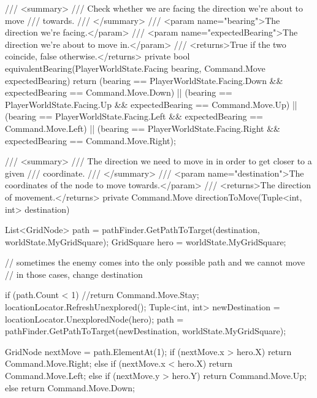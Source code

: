 \documentclass[11pt]{article}
\begin{document}
\begin{code}
{{        /// <summary>
        /// Check whether we are facing the direction we're about to move
        /// towards.
        /// </summary>
        /// <param name="bearing">The direction we're facing.</param>
        /// <param name="expectedBearing">The direction we're about to move in.</param>
        /// <returns>True if the two coincide, false otherwise.</returns>
        private bool equivalentBearing(PlayerWorldState.Facing bearing,
                                        Command.Move expectedBearing)
        {
            return (bearing == PlayerWorldState.Facing.Down 
                    && expectedBearing == Command.Move.Down)
                || (bearing == PlayerWorldState.Facing.Up 
                    && expectedBearing == Command.Move.Up)
                || (bearing == PlayerWorldState.Facing.Left 
                    && expectedBearing == Command.Move.Left)
                || (bearing == PlayerWorldState.Facing.Right 
                    && expectedBearing == Command.Move.Right);
        }

        /// <summary>
        /// The direction we need to move in in order to get closer to a given
        /// coordinate.
        /// </summary>
        /// <param name="destination">The coordinates of the node to move towards.</param>
        /// <returns>The direction of movement.</returns>
        private Command.Move directionToMove(Tuple<int, int> destination)
        {
            List<GridNode> path = pathFinder.GetPathToTarget(destination, worldState.MyGridSquare);
            GridSquare hero = worldState.MyGridSquare;

            // sometimes the enemy comes into the only possible path and we cannot move
            // in those cases, change destination

            if (path.Count < 1)
            {
                //return Command.Move.Stay;
                locationLocator.RefreshUnexplored();
                Tuple<int, int> newDestination = locationLocator.UnexploredNode(hero);
                path = pathFinder.GetPathToTarget(newDestination, worldState.MyGridSquare);
            }

            GridNode nextMove = path.ElementAt(1);
            if (nextMove.x > hero.X)
            {
                return Command.Move.Right;
            }
            else if (nextMove.x < hero.X)
            {
                return Command.Move.Left;
            }
            else if (nextMove.y > hero.Y)
            {
                return Command.Move.Up;
            }
            else
            {
                return Command.Move.Down;
            }
        }

}}
\end{code}
\end{document}
